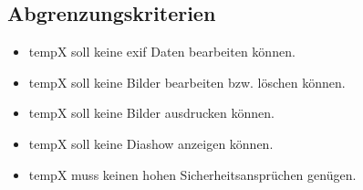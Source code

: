 \subsection{Abgrenzungskriterien} 
\begin{itemize}
	\item \gls{tempX} soll keine \gls{exif} Daten bearbeiten können.
	\item \gls{tempX} soll keine Bilder bearbeiten bzw. löschen können.
	\item \gls{tempX} soll keine Bilder ausdrucken können.
	\item \gls{tempX} soll keine Diashow anzeigen können.
	\item \gls{tempX} muss keinen hohen Sicherheitsansprüchen genügen.
\end{itemize}
